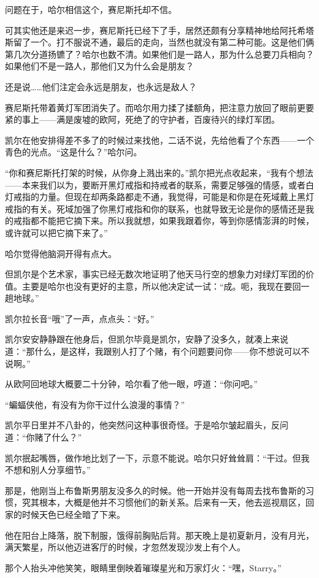 \documentclass[../main]{subfiles}
\begin{document}
问题在于，哈尔相信这个，赛尼斯托却不信。

可其实他还是来迟一步，赛尼斯托已经下了手，居然还颇有分享精神地给阿托希塔斯留了一个。打不服说不通，最后的走向，当然也就没有第二种可能。这是他们俩第几次分道扬镳了？哈尔也数不清。如果他们是一路人，那为什么总要刀兵相向？如果他们不是一路人，那他们又为什么会是朋友？

还是说……他们注定会永远是朋友，也永远是敌人？

赛尼斯托带着黄灯军团消失了。而哈尔用力揉了揉额角，把注意力放回了眼前更要紧的事上——满是废墟的欧阿，死绝了的守护者，百废待兴的绿灯军团。

凯尔在他安排得差不多了的时候过来找他，二话不说，先给他看了个东西——一个青色的光点。“这是什么？”哈尔问。

“你和赛尼斯托打架的时候，从你身上溅出来的。”凯尔把光点收起来，“我有个想法——本来我们以为，要断开黑灯戒指和持戒者的联系，需要足够强的情感，或者白灯戒指的力量。但现在却两条路都走不通，我觉得，可能是和你是在死域戴上黑灯戒指的有关。死域加强了你黑灯戒指和你的联系，也就导致无论是你的感情还是我的戒指都不能把它摘下来。所以我就想，如果我跟着你，等到你感情澎湃的时候，或许就可以把它摘下来了。”

哈尔觉得他脑洞开得有点大。

但凯尔是个艺术家，事实已经无数次地证明了他天马行空的想象力对绿灯军团的价值。主要是哈尔也没有更好的主意，所以他决定试一试：“成。呃，我现在要回一趟地球。”

凯尔拉长音“哦”了一声，点点头：“好。”

凯尔安安静静跟在他身后，但凯尔毕竟是凯尔，安静了没多久，就凑上来说道：“那什么，是这样，我跟别人打了个赌，有个问题要问你——你不想说可以不说啊。”

从欧阿回地球大概要二十分钟，哈尔看了他一眼，哼道：“你问吧。”

“蝙蝠侠他，有没有为你干过什么浪漫的事情？”

凯尔平日里并不八卦的，他突然问这种事很奇怪。于是哈尔皱起眉头，反问道：“你赌了什么？”

凯尔抿起嘴唇，做作地比划了一下，示意不能说。哈尔只好耸耸肩：“干过。但我不想和别人分享细节。”

那是，他刚当上布鲁斯男朋友没多久的时候。他一开始并没有每周去找布鲁斯的习惯，究其根本，大概是他并不习惯他们的新关系。后来有一天，他去巡视扇区，回家的时候天色已经全暗了下来。

他在阳台上降落，脱下制服，饿得前胸贴后背。那天晚上是初夏新月，没有月光，满天繁星，所以他迈进客厅的时候，才忽然发现沙发上有个人。

那个人抬头冲他笑笑，眼睛里倒映着璀璨星光和万家灯火：“嘿，Starry。”
\end{document}
